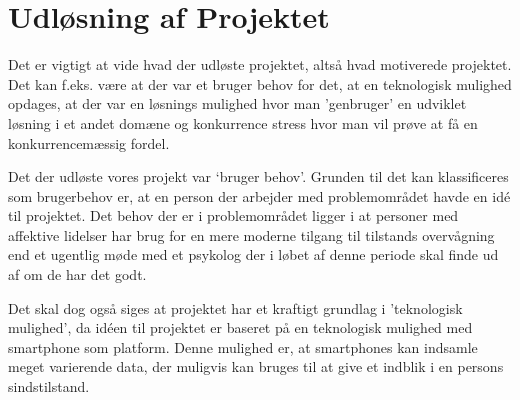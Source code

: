 \section{Udløsning af Projektet}
Det er vigtigt at vide hvad der udløste projektet, altså hvad motiverede projektet. 
Det kan f.eks. være at der var et bruger behov for det, at en teknologisk mulighed opdages, at der var en løsnings mulighed hvor man 'genbruger' en udviklet løsning i et andet domæne og konkurrence stress hvor man vil prøve at få en konkurrencemæssig fordel. 

Det der udløste vores projekt var `bruger behov'.
Grunden til det kan klassificeres som brugerbehov er, at en person der arbejder med problemområdet havde en idé til projektet. 
Det behov der er i problemområdet ligger i at personer med affektive lidelser har brug for en mere moderne tilgang til tilstands overvågning end et ugentlig møde med et psykolog der i løbet af denne periode skal finde ud af om de har det godt.

Det skal dog også siges at projektet har et kraftigt grundlag i 'teknologisk mulighed', da idéen til projektet er baseret på en teknologisk mulighed med smartphone som platform.
Denne mulighed er, at smartphones kan indsamle meget varierende data, der muligvis kan bruges til at give et indblik i en persons sindstilstand.
